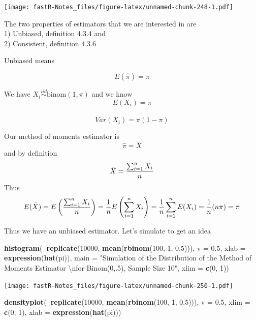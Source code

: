 \documentclass[]{book}
\newenvironment{Shaded}{\begin{snugshade}}{\end{snugshade}}
\newcommand{\KeywordTok}[1]{\textcolor[rgb]{0.13,0.29,0.53}{\textbf{#1}}}
\newcommand{\DataTypeTok}[1]{\textcolor[rgb]{0.13,0.29,0.53}{#1}}
\newcommand{\DecValTok}[1]{\textcolor[rgb]{0.00,0.00,0.81}{#1}}
\newcommand{\FloatTok}[1]{\textcolor[rgb]{0.00,0.00,0.81}{#1}}
\newcommand{\CharTok}[1]{\textcolor[rgb]{0.31,0.60,0.02}{#1}}
\newcommand{\StringTok}[1]{\textcolor[rgb]{0.31,0.60,0.02}{#1}}
\newcommand{\OperatorTok}[1]{\textcolor[rgb]{0.81,0.36,0.00}{\textbf{#1}}}
\newcommand{\NormalTok}[1]{#1}
\theoremstyle{definition}
\theoremstyle{definition}
\theoremstyle{definition}
\theoremstyle{remark}
\begin{document}
\texttt{[image: fastR-Notes\_files/figure-latex/unnamed-chunk-248-1.pdf]}

The two properties of estimators that we are interested in are\\
1) Unbiased, definition 4.3.4 and\\
2) Consistent, definition 4.3.6

Unbiased means

\[E(\hat{\pi})=\pi\]

We have \(X_{i} \overset{iid}{\sim} \mbox{binom} (1,\pi)\) and we know
\[E(X_{i})=\pi\]\\
\[Var(X_{i})=\pi(1-\pi)\]

Our method of moments estimator is \[\hat{\pi}=\bar{X}\] and by
definition\\
\[\bar{X}={\sum_{i=1}^{n}X_{i} \over n}\] Thus
\[E(\bar{X})=E \left( {\sum_{i=1}^{n}X_{i} \over n}\right)={1 \over n} E \left( \sum_{i=1}^{n}X_{i}\right)={1 \over n}\sum_{i=1}^{n}E(X_{i})={1 \over n}(n\pi)=\pi\]

Thus we have an unbiased estimator. Let's simulate to get an idea

\begin{Shaded}
\begin{Highlighting}[]
\KeywordTok{histogram}\NormalTok{(}\OperatorTok{~}\KeywordTok{replicate}\NormalTok{(}\DecValTok{10000}\NormalTok{, }\KeywordTok{mean}\NormalTok{(}\KeywordTok{rbinom}\NormalTok{(}\DecValTok{100}\NormalTok{, }\DecValTok{1}\NormalTok{, }\FloatTok{0.5}\NormalTok{))), }\DataTypeTok{v =} \FloatTok{0.5}\NormalTok{, }\DataTypeTok{xlab =} \KeywordTok{expression}\NormalTok{(}\KeywordTok{hat}\NormalTok{(pi)), }
    \DataTypeTok{main =} \StringTok{"Simulation of the Distribution of the Method of Moments Estimator }\CharTok{\textbackslash{}n}\StringTok{for Binom(0,.5), Sample Size 10"}\NormalTok{, }
    \DataTypeTok{xlim =} \KeywordTok{c}\NormalTok{(}\DecValTok{0}\NormalTok{, }\DecValTok{1}\NormalTok{))}
\end{Highlighting}
\end{Shaded}

\texttt{[image: fastR-Notes\_files/figure-latex/unnamed-chunk-250-1.pdf]}

\begin{Shaded}
\begin{Highlighting}[]
\KeywordTok{densityplot}\NormalTok{(}\OperatorTok{~}\KeywordTok{replicate}\NormalTok{(}\DecValTok{10000}\NormalTok{, }\KeywordTok{mean}\NormalTok{(}\KeywordTok{rbinom}\NormalTok{(}\DecValTok{100}\NormalTok{, }\DecValTok{1}\NormalTok{, }\FloatTok{0.5}\NormalTok{))), }\DataTypeTok{v =} \FloatTok{0.5}\NormalTok{, }\DataTypeTok{xlim =} \KeywordTok{c}\NormalTok{(}\DecValTok{0}\NormalTok{, }
    \DecValTok{1}\NormalTok{), }\DataTypeTok{xlab =} \KeywordTok{expression}\NormalTok{(}\KeywordTok{hat}\NormalTok{(pi)))}
\end{Highlighting}
\end{Shaded}
\end{document}
